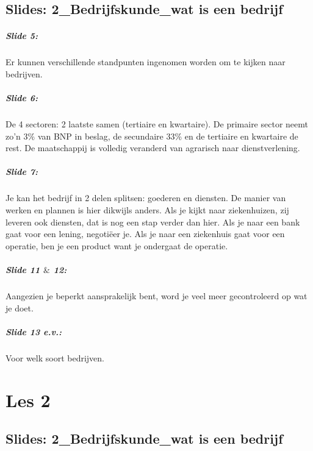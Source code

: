 \documentclass[10pt,a4paper]{report}
\begin{document}
\section{Slides: 2\_Bedrijfskunde\_wat is een bedrijf}

\paragraph{Slide 5:} Er kunnen verschillende standpunten ingenomen worden om te kijken naar bedrijven. 

\paragraph{Slide 6:} De 4 sectoren: 2 laatste samen (tertiaire en kwartaire). De primaire sector neemt zo'n 3\% van BNP in beslag, de secundaire 33\% en de tertiaire en kwartaire de rest. De maatschappij is volledig veranderd van agrarisch naar dienstverlening.

\paragraph{Slide 7:} Je kan het bedrijf in 2 delen splitsen: goederen en diensten. De manier van werken en plannen is hier dikwijls anders. Als je kijkt naar ziekenhuizen, zij leveren ook diensten, dat is nog een stap verder dan hier. Als je naar een bank gaat voor een lening, negoti\"eer je. Als je naar een ziekenhuis gaat voor een operatie, ben je een product want je ondergaat de operatie. 

\paragraph{Slide 11 $\&$ 12:} Aangezien je beperkt aansprakelijk bent, word je veel meer gecontroleerd op wat je doet. 

\paragraph{Slide 13 e.v.:} Voor welk soort bedrijven.

\chapter{Les 2}

\section{Slides: 2\_Bedrijfskunde\_wat is een bedrijf}
\end{document}
